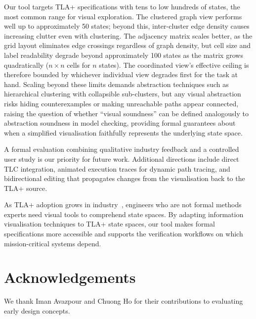 \documentclass[conference]{IEEEtran}
\begin{document}
Our tool targets TLA+ specifications with tens to low hundreds of states, the most common range for visual exploration. The clustered graph view performs well up to approximately 50 states; beyond this, inter-cluster edge density causes increasing clutter even with clustering. The adjacency matrix scales better, as the grid layout eliminates edge crossings regardless of graph density, but cell size and label readability degrade beyond approximately 100 states as the matrix grows quadratically ($n \times n$ cells for $n$ states). The coordinated view's effective ceiling is therefore bounded by whichever individual view degrades first for the task at hand. Scaling beyond these limits demands abstraction techniques such as hierarchical clustering with collapsible sub-clusters, but any visual abstraction risks hiding counterexamples or making unreachable paths appear connected, raising the question of whether ``visual soundness'' can be defined analogously to abstraction soundness in model checking, providing formal guarantees about when a simplified visualisation faithfully represents the underlying state space.

A formal evaluation combining qualitative industry feedback and a controlled user study is our priority for future work. Additional directions include direct TLC integration, animated execution traces for dynamic path tracing, and bidirectional editing that propagates changes from the visualisation back to the TLA+ source.

As TLA+ adoption grows in industry~\cite{newcombe2015amazon, resch2017tla}, engineers who are not formal methods experts need visual tools to comprehend state spaces. By adapting information visualisation techniques to TLA+ state spaces, our tool makes formal specifications more accessible and supports the verification workflows on which mission-critical systems depend.

\section*{Acknowledgements}

We thank Iman Avazpour and Chuong Ho for their contributions to evaluating early design concepts.%


\balance


\end{document}
